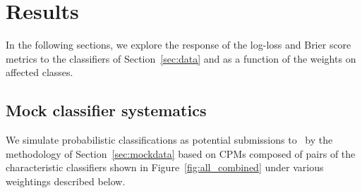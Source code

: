 \section{Results}
\label{sec:results}

In the following sections, we explore the response of the log-loss and Brier score metrics to the classifiers of Section~\ref{sec:data} and as a function of the weights on affected classes.

\subsection{Mock classifier systematics}
\label{sec:mockresults}

We simulate probabilistic classifications as potential submissions to \plasticc\ by the methodology of Section~\ref{sec:mockdata} based on CPMs composed of pairs of the characteristic classifiers shown in Figure~\ref{fig:all_combined} under various weightings described below.

